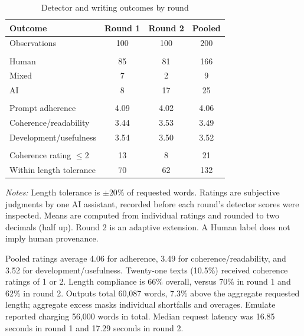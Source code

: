 \documentclass[11pt]{article}
\begin{document}
\begin{table}[htbp]
\centering
\begin{threeparttable}
\caption{Detector and writing outcomes by round}
\label{tab:aggregate}
\begin{tabular}{l S[table-format=3.2] S[table-format=3.2] S[table-format=3.2]}
\toprule
Outcome & {Round 1} & {Round 2} & {Pooled} \\
\midrule
Observations & 100 & 100 & 200 \\
\addlinespace
{} \\
Human & 85 & 81 & 166 \\
Mixed & 7 & 2 & 9 \\
AI & 8 & 17 & 25 \\
\addlinespace
{} \\
Prompt adherence & 4.09 & 4.02 & 4.06 \\
Coherence/readability & 3.44 & 3.53 & 3.49 \\
Development/usefulness & 3.54 & 3.50 & 3.52 \\
\addlinespace
{} \\
Coherence rating $\leq 2$ & 13 & 8 & 21 \\
Within length tolerance & 70 & 62 & 132 \\
\bottomrule
\end{tabular}
\begin{tablenotes}[flushleft]\footnotesize
\item \textit{Notes:} Length tolerance is $\pm20\%$ of requested words. Ratings are subjective judgments by one AI assistant, recorded before each round's detector scores were inspected. Means are computed from individual ratings and rounded to two decimals (half up). Round 2 is an adaptive extension. A Human label does not imply human provenance.
\end{tablenotes}
\end{threeparttable}
\end{table}

Pooled ratings average 4.06 for adherence, 3.49 for coherence/readability, and 3.52 for development/usefulness. Twenty-one texts (10.5\%) received coherence ratings of 1 or 2. Length compliance is 66\% overall, versus 70\% in round 1 and 62\% in round 2. Outputs total 60,087 words, 7.3\% above the aggregate requested length; aggregate excess masks individual shortfalls and overages. Emulate reported charging 56,000 words in total. Median request latency was 16.85 seconds in round 1 and 17.29 seconds in round 2.
\end{document}
